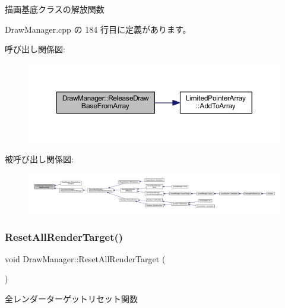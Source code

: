 描画基底クラスの解放関数 



 Draw\+Manager.\+cpp の 184 行目に定義があります。

呼び出し関係図\+:
\nopagebreak
\begin{figure}[H]
\begin{center}
\leavevmode
\includegraphics[width=350pt]{class_draw_manager_a287d1f359b87f075b22df6a9b6e99316_cgraph}
\end{center}
\end{figure}
被呼び出し関係図\+:
\nopagebreak
\begin{figure}[H]
\begin{center}
\leavevmode
\includegraphics[width=350pt]{class_draw_manager_a287d1f359b87f075b22df6a9b6e99316_icgraph}
\end{center}
\end{figure}
\mbox{\label{class_draw_manager_a20787acc9c5a096e80651dc1909ae60d}} 
\subsubsection{\texorpdfstring{Reset\+All\+Render\+Target()}{ResetAllRenderTarget()}}
{\footnotesize\ttfamily void Draw\+Manager\+::\+Reset\+All\+Render\+Target (\begin{DoxyParamCaption}{ }\end{DoxyParamCaption})\hspace{0.3cm}{\ttfamily [private]}}



全レンダーターゲットリセット関数 



